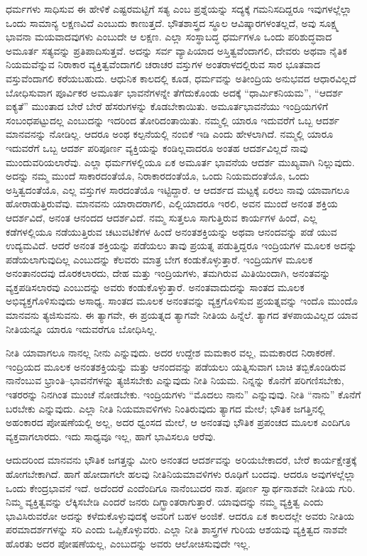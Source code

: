 ಧರ್ಮಗಳು ಸಾಧಿಸುವ ಈ ಹೇಳಿಕೆ ಎಷ್ಟರಮಟ್ಟಿಗೆ ಸತ್ಯ ಎಂಬ ಪ್ರಶ್ನೆಯನ್ನು ಸದ್ಯಕ್ಕೆ ಗಮನಿಸದಿದ್ದರೂ ಇವುಗಳಲ್ಲೆಲ್ಲಾ ಒಂದು ಸಾಮಾನ್ಯ ಲಕ್ಷಣವಿದೆ ಎಂಬುದು ಕಾಣುತ್ತದೆ. ಭೌತಶಾಸ್ತ್ರದ ಸ್ಥೂಲ ಆವಿಷ್ಕಾರಗಳಂತಲ್ಲದೆ, ಅವು ಸೂಕ್ಷ್ಮ ಭಾವನಾ ಮಯವಾದವುಗಳು ಎಂಬುದೇ ಆ ಲಕ್ಷಣ. ಎಲ್ಲಾ ಸಂಸ್ಥಾಬದ್ಧ ಧರ್ಮಗಳೂ ಒಂದು ಪರಿಶುದ್ಧವಾದ ಅಮೂರ್ತ ಸತ್ಯವನ್ನು ಪ್ರತಿಪಾದಿಸುತ್ತವೆ. ಅದನ್ನು ಸರ್ವ ವ್ಯಾಪಿಯಾದ ಅಸ್ತಿತ್ವವೆಂದಾಗಲಿ, ದೇವರು ಅಥವಾ ನೈತಿಕ ನಿಯಮವೆನ್ನುವ ನಿರಾಕಾರ ವ್ಯಕ್ತಿತ್ವವೆಂದಾಗಲಿ ಚರಾಚರ ವಸ್ತುಗಳ ಅಂತರಾಳದಲ್ಲಿರುವ ಸಾರ ಭೂತವಾದ ವಸ್ತುವೆಂದಾಗಲಿ ಕರೆಯಬಹುದು. ಆಧುನಿಕ ಕಾಲದಲ್ಲಿ ಕೂಡ, ಧರ್ಮವನ್ನು ಅತೀಂದ್ರಿಯ ಅನುಭವದ ಆಧಾರವಿಲ್ಲದೆ ಬೋಧಿಸುವಾಗ ಪೂರ್ವಿಕರ ಅಮೂರ್ತ ಭಾವನೆಗಳನ್ನೇ ತೆಗೆದುಕೊಂಡು ಅದಕ್ಕೆ “ಧಾರ್ಮಿಕನಿಯಮ”, “ಆದರ್ಶ ಐಕ್ಯತೆ” ಮುಂತಾದ ಬೇರೆ ಬೇರೆ ಹೆಸರುಗಳನ್ನು ಕೊಡಬೇಕಾಯಿತು. ಅಮೂರ್ತಭಾವನೆಯು ಇಂದ್ರಿಯಗಳಿಗೆ ಸಂಬಂಧಪಟ್ಟುದಲ್ಲ ಎಂಬುದನ್ನು ಇದರಿಂದ ತೋರಿದಂತಾಯಿತು. ನಮ್ಮಲ್ಲಿ ಯಾರೂ ಇದುವರೆಗೆ ಒಬ್ಬ ಆದರ್ಶ ಮಾನವನನ್ನು ನೋಡಿಲ್ಲ. ಆದರೂ ಅಂಥ ಕಲ್ಪನೆಯಲ್ಲಿ ನಂಬಿಕೆ ಇಡಿ ಎಂದು ಹೇಳಲಾಗಿದೆ. ನಮ್ಮಲ್ಲಿ ಯಾರೂ ಇದುವರೆಗೆ ಒಬ್ಬ ಆದರ್ಶ ಪರಿಪೂರ್ಣ ವ್ಯಕ್ತಿಯನ್ನು ಕಂಡಿಲ್ಲವಾದರೂ ಅಂತಹ ಆದರ್ಶವಿಲ್ಲದೆ ನಾವು ಮುಂದುವರಿಯಲಾರೆವು. ಎಲ್ಲಾ ಧರ್ಮಗಳಲ್ಲಿಯೂ ಏಕ ಅಮೂರ್ತ ಭಾವನೆಯ ಆದರ್ಶ ಮುಖ್ಯವಾಗಿ ನಿಲ್ಲುವುದು. ಅದನ್ನು ನಮ್ಮ ಮುಂದೆ ಸಾಕಾರದಂತೆಯೊ, ನಿರಾಕಾರದಂತೆಯೊ, ಒಂದು ನಿಯಮದಂತೆಯೊ, ಒಂದು ಅಸ್ತಿತ್ವದಂತೆಯೊ, ಎಲ್ಲ ವಸ್ತುಗಳ ಸಾರದಂತೆಯೊ ಇಟ್ಟಿದ್ದಾರೆ. ಆ ಆದರ್ಶದ ಮಟ್ಟಕ್ಕೆ ಏರಲು ನಾವು ಯಾವಾಗಲೂ ಹೋರಾಡುತ್ತಿರುವೆವು. ಮಾನವನು ಯಾರಾದರಾಗಲಿ, ಎಲ್ಲಿಯಾದರೂ ಇರಲಿ, ಅವನ ಮುಂದೆ ಅನಂತ ಶಕ್ತಿಯ ಆದರ್ಶವಿದೆ, ಅನಂತ ಆನಂದದ ಆದರ್ಶವಿದೆ. ನಮ್ಮ ಸುತ್ತಲೂ ಸಾಗುತ್ತಿರುವ ಕಾರ್ಯಗಳ ಹಿಂದೆ, ಎಲ್ಲ ಕಡೆಗಳಲ್ಲಿಯೂ ನಡೆಯುತ್ತಿರುವ ಚಟುವಟಿಕೆಗಳ ಹಿಂದೆ ಅನಂತಶಕ್ತಿಯನ್ನು ಅಥವಾ ಆನಂದವನ್ನು ಪಡೆ ಯುವ ಉದ್ಯಮವಿದೆ. ಆದರೆ ಅನಂತ ಶಕ್ತಿಯನ್ನು ಪಡೆಯಲು ತಾವು ಪ್ರಯತ್ನ ಪಡುತ್ತಿದ್ದರೂ ಇಂದ್ರಿಯಗಳ ಮೂಲಕ ಅದನ್ನು ಪಡೆಯಲಾಗುವುದಿಲ್ಲ ಎಂಬುದನ್ನು ಕೆಲವರು ಮಾತ್ರ ಬೇಗ ಕಂಡುಕೊಳ್ಳುತ್ತಾರೆ. ಇಂದ್ರಿಯಗಳ ಮೂಲಕ ಅನಂತಾನಂದವು ದೊರಕಲಾರದು, ದೇಹ ಮತ್ತು ಇಂದ್ರಿಯಗಳು, ತಮಗಿರುವ ಮಿತಿಯಿಂದಾಗಿ, ಅನಂತವನ್ನು ವ್ಯಕ್ತಪಡಿಸಲಾರವು ಎಂಬುದನ್ನು ಅವರು ಕಂಡುಕೊಳ್ಳುತ್ತಾರೆ. ಅನಂತವಾದುದನ್ನು ಸಾಂತದ ಮೂಲಕ ಅಭಿವ್ಯಕ್ತಗೊಳಿಸುವುದು ಅಸಾಧ್ಯ. ಸಾಂತದ ಮೂಲಕ ಅನಂತವನ್ನು ವ್ಯಕ್ತಗೊಳಿಸುವ ಪ್ರಯತ್ನವನ್ನು ಇಂದೊ ಮುಂದೊ ಮಾನವನು ತ್ಯಜಿಸುವನು. ಈ ತ್ಯಾಗವೇ, ಈ ಪ್ರಯತ್ನದ ತ್ಯಾಗವೇ ನೀತಿಯ ಹಿನ್ನೆಲೆ. ತ್ಯಾಗದ ತಳಪಾಯವಿಲ್ಲದ ಯಾವ ನೀತಿಯನ್ನೂ ಯಾರೂ ಇದುವರೆಗೂ ಬೋಧಿಸಿಲ್ಲ.

ನೀತಿ ಯಾವಾಗಲೂ ನಾನಲ್ಲ ನೀನು ಎನ್ನುವುದು. ಅದರ ಉದ್ದೇಶ ಮಮಕಾರ ವಲ್ಲ, ಮಮಕಾರದ ನಿರಾಕರಣೆ. ಇಂದ್ರಿಯದ ಮೂಲಕ ಅನಂತಶಕ್ತಿಯನ್ನು ಮತ್ತು ಆನಂದವನ್ನು ಪಡೆಯಲು ಯತ್ನಿಸುವಾಗ ಬಾಚಿ ತಬ್ಬಿಕೊಂಡಿರುವ ನಾನೆಂಬುವ ಭ್ರಾಂತಿ–ಭಾವನೆಗಳನ್ನು ತ್ಯಜಿಸಬೇಕು ಎನ್ನುವುದು ನೀತಿ ನಿಯಮ. ನಿನ್ನನ್ನು ಕೊನೆಗೆ ಪರಿಗಣಿಸಬೇಕು, ಇತರರನ್ನು ನಿನಗಿಂತ ಮುಂಚೆ ನೋಡಬೇಕು. ಇಂದ್ರಿಯಗಳು “ಮೊದಲು ನಾನು” ಎನ್ನುವುವು. ನೀತಿ “ನಾನು” ಕೊನೆಗೆ ಬರಬೇಕು ಎನ್ನುವುದು. ಎಲ್ಲಾ ನೀತಿ ನಿಯಮಾವಳಿಗಳು ನಿಂತಿರುವುದು ತ್ಯಾಗದ ಮೇಲೆ; ಭೌತಿಕ ಜಗತ್ತಿನಲ್ಲಿ ಅಹಂಕಾರದ ಪೋಷಣೆಯಲ್ಲಿ ಅಲ್ಲ, ಅದರ ಧ್ವಂಸದ ಮೇಲೆ, ಆ ಅನಂತವು ಭೌತಿಕ ಪ್ರಪಂಚದ ಮೂಲಕ ಎಂದಿಗೂ ವ್ಯಕ್ತವಾಗಲಾರದು. ಇದು ಸಾಧ್ಯವೂ ಇಲ್ಲ, ಹಾಗೆ ಭಾವಿಸಲೂ ಆರೆವು.

ಆದುದರಿಂದ ಮಾನವನು ಭೌತಿಕ ಜಗತ್ತನ್ನು ಮೀರಿ ಅನಂತದ ಆದರ್ಶವನ್ನು ಅರಿಯಬೇಕಾದರೆ, ಬೇರೆ ಕಾರ್ಯಕ್ಷೇತ್ರಕ್ಕೆ ಹೋಗಬೇಕಾಗಿದೆ. ಹಾಗೆ ಹೋದಾಗಲೇ ಹಲವು ನೀತಿನಿಯಮಾವಳಿಗಳು ರೂಢಿಗೆ ಬಂದವು. ಆದರೂ ಅವುಗಳಲ್ಲೆಲ್ಲಾ ಒಂದು ಕೇಂದ್ರಭಾವನೆ ಇದೆ. ಅದೆಂದರೆ ಎಂದೆಂದಿಗೂ ನಾನೆಂಬುದರ ನಾಶ. ಪೂರ್ಣ ಸ್ವಾರ್ಥನಾಶವೇ ನೀತಿಯ ಗುರಿ. ನಿಮ್ಮ ವ್ಯಕ್ತಿತ್ವವನ್ನು ಲೆಕ್ಕಿಸಬೇಡಿ ಎಂದರೆ ಜನರು ದಿಗ್ಭ್ರಾಂತರಾಗುತ್ತಾರೆ. ಯಾವುದನ್ನು ನಮ್ಮ ವ್ಯಕ್ತಿತ್ವ ಎಂದು ಭಾವಿಸಿರುವರೋ ಅದನ್ನು ಕಳೆದುಕೊಳ್ಳುವುದಕ್ಕೆ ಅವರಿಗೆ ಬಹಳ ಅಂಜಿಕೆ. ಆದರೂ ಏಕ ಕಾಲದಲ್ಲೇ ಅವರು ನೀತಿಯ ಪರಮಾದರ್ಶಗಳನ್ನು ಸರಿ ಎಂದು ಒಪ್ಪಿಕೊಳ್ಳುವರು. ಎಲ್ಲಾ ನೀತಿ ಶಾಸ್ತ್ರಗಳ ಗುರಿಯ ಆಶಯವು ವ್ಯಕ್ತಿತ್ವದ ನಾಶವೇ ಹೊರತು ಅದರ ಪೋಷಣೆಯಲ್ಲ, ಎಂಬುದನ್ನು ಅವರು ಆಲೋಚಿಸುವುದೇ ಇಲ್ಲ.

